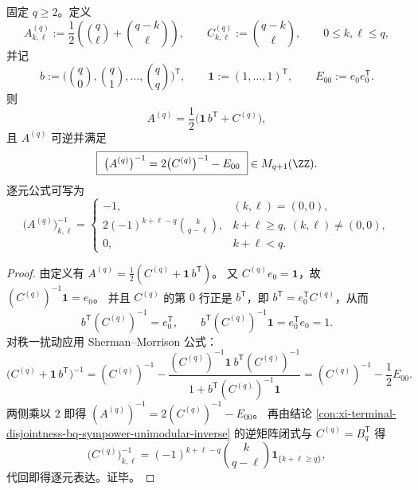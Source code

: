 \begin{theorem}[例外谱块的二项核逆矩阵闭式]\label{thm:xi-exceptional-binomial-kernel-inverse}
固定 \(q\ge 2\)。定义
\[
A^{(q)}_{k,\ell}:=\frac12\!\left(\binom{q}{\ell}+\binom{q-k}{\ell}\right),\qquad
C^{(q)}_{k,\ell}:=\binom{q-k}{\ell},
\qquad 0\le k,\ell\le q,
\]
并记
\[
b:=\bigl(\binom{q}{0},\binom{q}{1},\dots,\binom{q}{q}\bigr)^{\mathsf T},\qquad
\mathbf 1:=(1,\dots,1)^{\mathsf T},\qquad
E_{00}:=e_0e_0^{\mathsf T}.
\]
则
\[
A^{(q)}=\frac12\bigl(\mathbf 1\,b^{\mathsf T}+C^{(q)}\bigr),
\]
且 \(A^{(q)}\) 可逆并满足
\[
\boxed{\ \bigl(A^{(q)}\bigr)^{-1}=2\bigl(C^{(q)}\bigr)^{-1}-E_{00}\ }\in M_{q+1}(\ZZ).
\]
逐元公式可写为
\[
\bigl(A^{(q)}\bigr)^{-1}_{k,\ell}=
\begin{cases}
-1,&(k,\ell)=(0,0),\\[2mm]
2(-1)^{k+\ell-q}\binom{k}{q-\ell},&k+\ell\ge q,\ (k,\ell)\neq(0,0),\\[2mm]
0,&k+\ell<q.
\end{cases}
\]
\end{theorem}
\begin{proof}
由定义有 \(A^{(q)}=\frac12(C^{(q)}+\mathbf 1\,b^{\mathsf T})\)。
又 \(C^{(q)}e_0=\mathbf 1\)，故 \((C^{(q)})^{-1}\mathbf 1=e_0\)。
并且 \(C^{(q)}\) 的第 \(0\) 行正是 \(b^{\mathsf T}\)，即 \(b^{\mathsf T}=e_0^{\mathsf T}C^{(q)}\)，从而
\[
b^{\mathsf T}(C^{(q)})^{-1}=e_0^{\mathsf T},
\qquad
b^{\mathsf T}(C^{(q)})^{-1}\mathbf 1=e_0^{\mathsf T}e_0=1.
\]
对秩一扰动应用 Sherman--Morrison 公式：
\[
\bigl(C^{(q)}+\mathbf 1\,b^{\mathsf T}\bigr)^{-1}
=(C^{(q)})^{-1}
-\frac{(C^{(q)})^{-1}\mathbf 1\ b^{\mathsf T}(C^{(q)})^{-1}}
{1+b^{\mathsf T}(C^{(q)})^{-1}\mathbf 1}
=(C^{(q)})^{-1}-\frac12E_{00}.
\]
两侧乘以 \(2\) 即得
\(
(A^{(q)})^{-1}=2(C^{(q)})^{-1}-E_{00}
\)。
再由结论 \ref{con:xi-terminal-disjointness-bq-sympower-unimodular-inverse} 的逆矩阵闭式与 \(C^{(q)}=B_q^{\mathsf T}\) 得
\[
\bigl(C^{(q)}\bigr)^{-1}_{k,\ell}
=(-1)^{k+\ell-q}\binom{k}{q-\ell}\mathbf 1_{\{k+\ell\ge q\}},
\]
代回即得逐元表达。证毕。
\end{proof}

